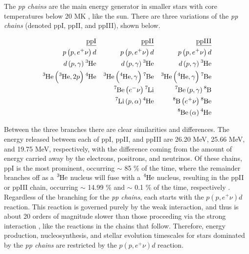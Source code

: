 The \textit{pp chains} are the main energy generator in smaller stars with core temperatures below 20 MK \cite{RyanNortonBook}, like the sun. There are three variations of the \textit{pp chains} (denoted ppI, ppII, and ppIII), shown below.

\begin{align*}
\underline{\mathrm{ppI}} & & \underline{\mathrm{ppII}} & &\underline{\mathrm{ppIII}}  & \\
p\left(p, e^{+} \nu \right) d & & p\left(p, e^{+} \nu \right) d & & p\left(p, e^{+} \nu \right) d \\
d\left(p, \gamma \right) \ce{^{3}He} & & d\left(p, \gamma \right) \ce{^{3}He} & & d\left(p, \gamma \right) \ce{^{3}He} \\ 
\ce{^{3}He} \left( \ce{^{3}He}, 2p \right) \ce{^{4}He} & & \ce{^{3}He} \left( \ce{^{4}He}, \gamma \right) \ce{^{7}Be} &  &  \ce{^{3}He} \left( \ce{^{4}He}, \gamma \right) \ce{^{7}Be}  \\
& & \ce{^{7}Be}  \left( e^{-} \nu \right) \ce{^{7}Li} & & \ce{^{7}Be} \left( p, \gamma \right) \ce{^{8}B} \\
& & \ce{^{7}Li} \left( p, \alpha \right) \ce{^{4}He} & & \ce{^{8}B} \left( e^{+} \nu \right) \ce{^{8}Be} \\
& & & & \ce{^{8}Be} \left( \alpha \right) \ce{^{4}He} 
\end{align*}

Between the three branches there are clear similarities and differences. The energy released between each of ppI, ppII, and ppIII are 26.20 MeV, 25.66 MeV, and 19.75 MeV, respectively, with the difference coming from the amount of energy carried away by the electrons, positrons, and neutrinos. Of these chains, ppI is the most prominent, occurring $\sim$ 85 \% of the time, where the remainder branches off as a $\ce{^{3}He}$ nucleus will fuse with a $\ce{^{4}He}$ nucleus, resulting in the ppII or ppIII chain, occurring $\sim$ 14.99 \% and $\sim$ 0.1 \% of the time, respectively \cite{RyanNortonBook}. Regardless of the branching for the \textit{pp chains}, each starts with the $p\left(p, e^{+} \nu \right) d$ reaction. This reaction is governed purely by the weak interaction, and thus is about 20 orders of magnitude slower than those proceeding via the strong interaction \cite{RolfsBook}, like the reactions in the chains that follow. Therefore, energy production, nucleosynthesis, and stellar evolution timescales for stars dominated by the \textit{pp chains} are restricted by the $p\left(p, e^{+} \nu \right) d$ reaction.


